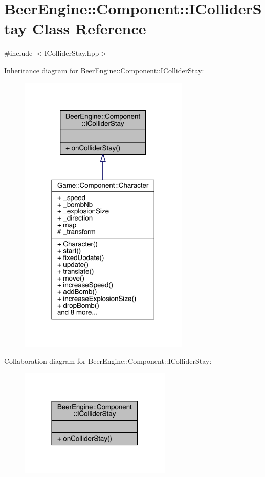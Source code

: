 \hypertarget{class_beer_engine_1_1_component_1_1_i_collider_stay}{}\section{Beer\+Engine\+:\+:Component\+:\+:I\+Collider\+Stay Class Reference}
\label{class_beer_engine_1_1_component_1_1_i_collider_stay}


{\ttfamily \#include $<$I\+Collider\+Stay.\+hpp$>$}



Inheritance diagram for Beer\+Engine\+:\+:Component\+:\+:I\+Collider\+Stay\+:\nopagebreak
\begin{figure}[H]
\begin{center}
\leavevmode
\includegraphics[width=230pt]{class_beer_engine_1_1_component_1_1_i_collider_stay__inherit__graph}
\end{center}
\end{figure}


Collaboration diagram for Beer\+Engine\+:\+:Component\+:\+:I\+Collider\+Stay\+:\nopagebreak
\begin{figure}[H]
\begin{center}
\leavevmode
\includegraphics[width=206pt]{class_beer_engine_1_1_component_1_1_i_collider_stay__coll__graph}
\end{center}
\end{figure}
